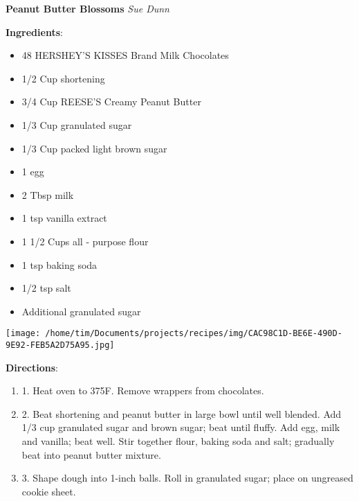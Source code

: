 \documentclass[11pt, twoside, openany]{book}
\begin{document}
\noindent\begin{minipage}[t]{\linewidth}%
{\Large\textbf{Peanut Butter Blossoms}} \label{peanut-butter-blossoms}\hfill\textit{Sue Dunn}\\
\noindent\begin{minipage}[t]{0.78\linewidth}%
\textbf{Ingredients}:\vspace{-3mm}
\begin{multicols}{2}
\begin{itemize}\setlength\itemsep{-1mm}
\item 48 HERSHEY'S KISSES Brand Milk Chocolates
\item 1/2 Cup shortening
\item 3/4 Cup REESE'S Creamy Peanut Butter
\item 1/3 Cup granulated sugar
\item 1/3 Cup packed light brown sugar
\item 1 egg
\item 2 Tbsp milk
\item 1 tsp vanilla extract
\item 1 1/2 Cups all - purpose flour
\item 1 tsp baking soda
\item 1/2 tsp salt
\item Additional granulated sugar
\end{itemize}
\end{multicols}
\end{minipage}
\noindent\begin{minipage}[t]{0.18\linewidth}
\centering \strut\vspace*{-\baselineskip}\newline
\texttt{[image: /home/tim/Documents/projects/recipes/img/CAC98C1D-BE6E-490D-9E92-FEB5A2D75A95.jpg]}\\
\end{minipage}\vspace{3mm}
\textbf{Directions}:
\vspace{-3mm}\begin{enumerate}\setlength\itemsep{-1mm}
\item 1. Heat oven to 375F. Remove wrappers from chocolates.
\item 2. Beat shortening and peanut butter in large bowl until well blended. Add 1/3 cup granulated sugar and brown sugar; beat until fluffy. Add egg, milk and vanilla; beat well. Stir together flour, baking soda and salt; gradually beat into peanut butter mixture.
\item 3. Shape dough into 1-inch balls. Roll in granulated sugar; place on ungreased cookie sheet.

\end{enumerate}
\end{minipage}
\end{document}
